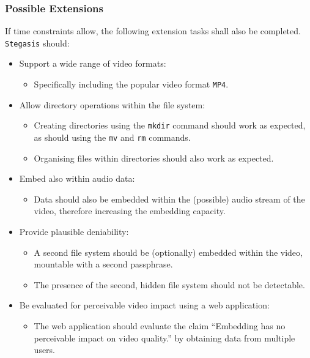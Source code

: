\documentclass[paper=a4, fontsize=11pt,twoside]{scrartcl}    %
\numberwithin{table}{section}
\numberwithin{figure}{section}
\numberwithin{algorithm}{section}
\begin{document}
\subsubsection{Possible Extensions}

If time constraints allow, the following extension tasks shall also be completed.\\

\noindent
\texttt{Stegasis} should:

\begin{itemize}
\item Support a wide range of video formats:
	\begin{itemize}
		\item Specifically including the popular video format \texttt{MP4}.		
	\end{itemize}
\item Allow directory operations within the file system:
	\begin{itemize}
		\item Creating directories using the \texttt{mkdir} command should work as expected, as should using the \texttt{mv} and \texttt{rm} commands.
		\item Organising files within directories should also work as expected.
	\end{itemize}	
\item Embed also within audio data:
	\begin{itemize}
		\item Data should also be embedded within the (possible) audio stream of the video, therefore increasing the embedding capacity.
	\end{itemize}	
\item Provide plausible deniability:
	\begin{itemize}
		\item A second file system should be (optionally) embedded within the video, mountable with a second passphrase.
		\item The presence of the second, hidden file system should not be detectable.
	\end{itemize}
\item Be evaluated for perceivable video impact using a web application:
	\begin{itemize}
		\item The web application should evaluate the claim ``Embedding has no perceivable impact on video quality.'' by obtaining data from multiple users.
	\end{itemize}		
\end{itemize}
\end{document}
